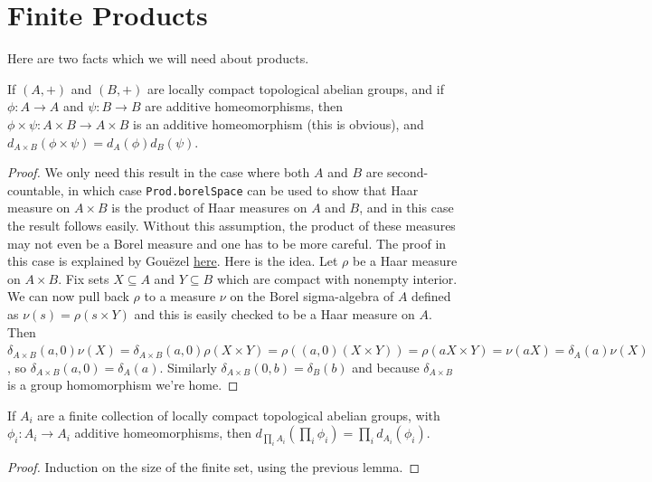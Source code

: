 \section{Finite Products}

Here are two facts which we will need about products.

\begin{lemma}
  \label{MeasureTheory.addEquivAddHaarChar_prodCongr}
  \leanok
  If $(A,+)$ and $(B,+)$ are locally compact topological abelian groups,
  and if $\phi:A\to A$ and $\psi:B\to B$ are additive homeomorphisms,
  then $\phi\times\psi:A\times B\to A\times B$ is an additive homeomorphism (this is
  obvious), and
  $d_{A\times B}(\phi\times\psi)=d_A(\phi)d_B(\psi)$.
\end{lemma}
\begin{proof}
  \leanok
  We only need this result in the case where both $A$ and $B$ are second-countable, in which case
  {\tt Prod.borelSpace} can be used to show that Haar measure on $A\times B$ is the product of
  Haar measures on $A$ and $B$, and in this case the result follows easily. Without this assumption,
  the product of these measures may not even be a Borel measure and one has to be more careful.
  The proof in this case is explained by Gou\"{e}zel
  \href{https://leanprover.zulipchat.com/#narrow/channel/116395-maths/topic/Product.20of.20Borel.20spaces/near/487257981}{here}.
  Here is the idea. Let $\rho$ be a Haar measure on $A\times B$. Fix sets $X\subseteq A$ and
  $Y\subseteq B$ which are compact with nonempty interior. We can now pull back $\rho$
  to a measure $\nu$ on the Borel sigma-algebra of $A$ defined as $\nu(s)=\rho(s\times Y)$
  and this is easily checked to be a Haar measure on $A$. Then
  $\delta_{A\times B}(a,0)\nu(X)=
  \delta_{A\times B}(a,0)\rho(X\times Y)=\rho((a,0)(X\times Y))=
  \rho(aX\times Y)=\nu(aX)=\delta_A(a)\nu(X)$
  , so $\delta_{A\times B}(a,0)=\delta_A(a)$.
  Similarly $\delta_{A\times B}(0,b)=\delta_B(b)$ and because $\delta_{A\times B}$ is a group
  homomorphism we're home.
\end{proof}

\begin{lemma}
  \label{MeasureTheory.addEquivAddHaarChar_piCongrRight}
  \leanok
  If $A_i$ are a finite collection of locally compact topological abelian groups,
  with $\phi_i:A_i\to A_i$ additive homeomorphisms, then $d_{\prod_i A_i}(\prod_i\phi_i)=\prod_i d_{A_i}(\phi_i)$.
\end{lemma}
\begin{proof}
  \leanok
  Induction on the size of the finite set, using the previous lemma.
\end{proof}

